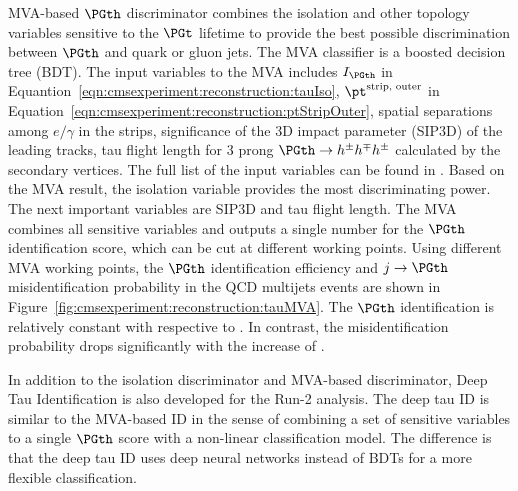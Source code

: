 MVA-based $\PGth$ discriminator combines the isolation and other topology variables sensitive to the $\PGt$ lifetime \cite{Sirunyan:2018pgf} to provide the best possible discrimination between $\PGth$ and quark or gluon jets. The MVA classifier is a boosted decision tree (BDT). The input variables to the MVA includes $I_{\PGth}$ in Equantion~\ref{eqn:cmsexperiment:reconstruction:tauIso}, $ \pt^{\text{strip, outer}}$ in Equation~\ref{eqn:cmsexperiment:reconstruction:ptStripOuter}, spatial separations among $e/\gamma$ in the strips, significance of the 3D impact parameter (SIP3D) of the leading tracks, tau flight length for 3 prong $\PGth \to h^\pm h^\mp h^\pm$ calculated by the secondary vertices. The full list of the input variables can be found in \cite{Chatrchyan:2012zz, Khachatryan:2015dfa}. Based on the MVA result, the isolation variable provides the most discriminating power. The next important variables are SIP3D and tau flight length. The MVA combines all sensitive variables and outputs a single number for the $\PGth$ identification score, which can be cut at different working points. Using different MVA working points, the $\PGth$ identification efficiency and $j\to \PGth$ misidentification probability in the QCD multijets events are shown in Figure~\ref{fig:cmsexperiment:reconstruction:tauMVA}. The $\PGth$ identification is relatively constant with respective to \pt. In contrast, the misidentification probability drops significantly with the increase of \pt. 

In addition to the isolation discriminator and MVA-based discriminator, Deep Tau Identification is also developed for the Run-2 analysis. The deep tau ID is similar to the MVA-based ID in the sense of combining a set of sensitive variables to a single $\PGth$ score with a non-linear classification model. The difference is that the deep tau ID uses deep neural networks instead of BDTs for a more flexible classification. 





